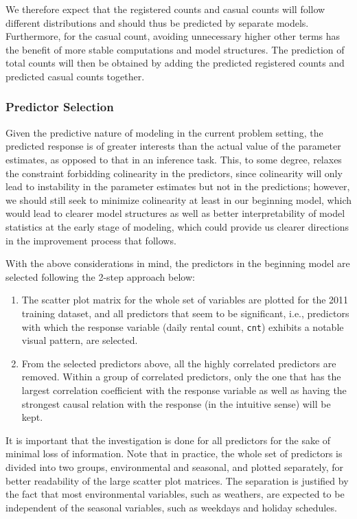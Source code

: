 \documentclass[
  twocolumn]{article}
\begin{document}
We therefore expect that the registered counts and casual counts will
follow different distributions and should thus be predicted by separate
models. Furthermore, for the casual count, avoiding unnecessary higher
other terms has the benefit of more stable computations and model
structures. The prediction of total counts will then be obtained by
adding the predicted registered counts and predicted casual counts
together.

\hypertarget{predictor-selection}{%
\subsubsection{Predictor Selection}\label{predictor-selection}}

Given the predictive nature of modeling in the current problem setting,
the predicted response is of greater interests than the actual value of
the parameter estimates, as opposed to that in an inference task. This,
to some degree, relaxes the constraint forbidding colinearity in the
predictors, since colinearity will only lead to instability in the
parameter estimates but not in the predictions; however, we should still
seek to minimize colinearity at least in our beginning model, which
would lead to clearer model structures as well as better
interpretability of model statistics at the early stage of modeling,
which could provide us clearer directions in the improvement process
that follows.

With the above considerations in mind, the predictors in the beginning
model are selected following the 2-step approach below:

\begin{enumerate}
\def\labelenumi{\arabic{enumi}.}
\item
  The scatter plot matrix for the whole set of variables are plotted for
  the 2011 training dataset, and all predictors that seem to be
  significant, i.e., predictors with which the response variable (daily
  rental count, \texttt{cnt}) exhibits a notable visual pattern, are
  selected.
\item
  From the selected predictors above, all the highly correlated
  predictors are removed. Within a group of correlated predictors, only
  the one that has the largest correlation coefficient with the response
  variable as well as having the strongest causal relation with the
  response (in the intuitive sense) will be kept.
\end{enumerate}

It is important that the investigation is done for all predictors for
the sake of minimal loss of information. Note that in practice, the
whole set of predictors is divided into two groups, environmental and
seasonal, and plotted separately, for better readability of the large
scatter plot matrices. The separation is justified by the fact that most
environmental variables, such as weathers, are expected to be
independent of the seasonal variables, such as weekdays and holiday
schedules.
\end{document}
